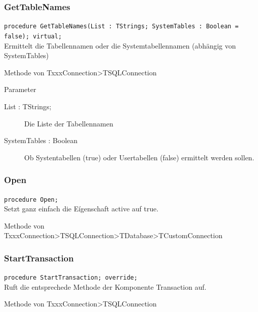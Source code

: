 \subsubsection{GetTableNames}
\begin{description}
  \item \texttt{procedure GetTableNames(List : TStrings; SystemTables : Boolean = false); virtual;}\\Ermittelt die Tabellennamen oder die Systemtabellennamen (abhängig von SystemTables)
  \begin{description}
    \item Methode von TxxxConnection>TSQLConnection
  \end{description}
  \begin{description}
    \item Parameter
    \begin{description}
      \item[List : TStrings;] Die Liste der Tabellennamen
      \item[SystemTables : Boolean] Ob Systentabellen (true) oder Usertabellen (false) ermittelt werden sollen.
    \end{description}
  \end{description}
\end{description}

\subsubsection{Open}
\begin{description}
  \item \texttt{procedure Open;}\\Setzt ganz einfach die Eígenschaft active auf true.
  \begin{description}
    \item Methode von TxxxConnection>TSQLConnection>TDatabase>TCustomConnection
  \end{description}
\end{description}

\subsubsection{StartTransaction}
\begin{description}
  \item \texttt{procedure StartTransaction; override;}\\Ruft die entsprechede Methode der Komponente Transaction auf.
  \begin{description}
    \item Methode von TxxxConnection>TSQLConnection
  \end{description}
\end{description}

